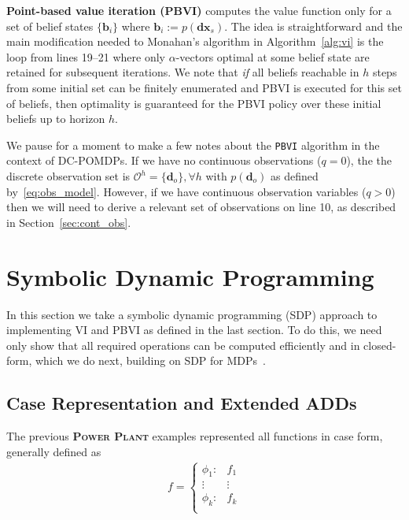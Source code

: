 \documentclass{article} %
\renewcommand{\vec}[1]{\mathbf{#1}} %
\newcommand{\xds}{\mathbf{dx}_s}
\begin{document}
\textbf{Point-based value iteration (PBVI)} computes the value function only for a set of belief states $\{ \vec{b}_i \}$ where $\vec{b}_i := p(\xds)$.  The idea is straightforward and the main modification needed to Monahan's algorithm in Algorithm~\ref{alg:vi} is the loop from lines 19--21 where only $\alpha$-vectors optimal at some belief state are retained for subsequent iterations.  We note that \emph{if} all beliefs reachable in $h$ steps from some initial set can be finitely enumerated and PBVI is executed for this set of beliefs, then optimality is guaranteed for the PBVI policy over these initial beliefs up to horizon $h$.  


We pause for a moment to make a few notes about the \texttt{PBVI}
algorithm in the context of DC-POMDPs.  If we have no continuous
observations ($q=0$), the the discrete observation set is
$\mathcal{O}^h = \{ \vec{d}_o \}, \forall h$ with $p(\vec{d}_o)$ as
defined by~\eqref{eq:obs_model}.  However, if we have continuous
observation variables ($q > 0$) then we will need to derive a relevant
set of observations on line 10, as described in
Section~\ref{sec:cont_obs}.  


\section{Symbolic Dynamic Programming} 

In this section we take a symbolic dynamic programming (SDP) approach
to implementing VI and PBVI as defined in the last section.  To do this,
we need only show that all required operations can be computed efficiently
and in closed-form, which we do next, building on SDP for 
MDPs~\cite{sanner_uai11}.  

\subsection{Case Representation and Extended ADDs}
\label{sec:case}

The previous \textsc{\bf Power Plant} examples represented all functions in case form,
generally defined as {\footnotesize
\vspace{-1mm}
\begin{align}
f = 
\begin{cases}
  \phi_1: & f_1 \\ 
 \vdots&\vdots\\ 
  \phi_k: & f_k \\ 
\end{cases} \nonumber
\end{align}
\vspace{-4mm}
}
\end{document}
